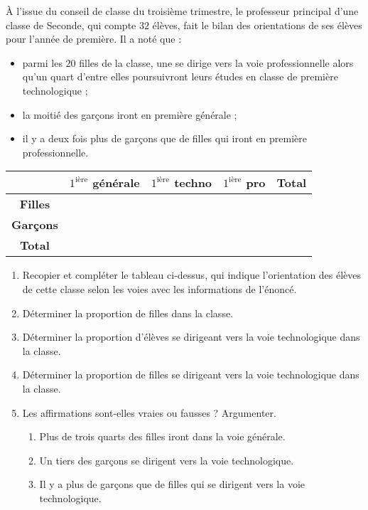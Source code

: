 \documentclass[11pt]{article}
\begin{document}
\begin{exo}
À l’issue du conseil de classe du troisième trimestre, le professeur principal
d’une classe de Seconde, qui compte $32$ élèves, fait le bilan des orientations de ses élèves pour l’année de première. Il a noté que :
\begin{itemize}
  \item parmi les $20$ filles de la classe, une se dirige vers la voie
    professionnelle alors qu’un quart d’entre elles poursuivront leurs études en
    classe de première technologique ;
  \item la moitié des garçons iront en première générale ;
  \item il y a deux fois plus de garçons que de filles qui iront en première
    professionnelle.
\end{itemize}
  \begin{center}
    \def\arraystretch{1.75}
 \begin{tabular}{|c|c|c|c|c|}
   \hline
   & \textbf{$1^\text{ière}$ générale} & \textbf{$1^\text{ière}$ techno} &
   \textbf{$1^\text{ière}$ pro} &\textbf{Total} \\
   \hline
  \textbf{Filles} &  &  &  & \\
   \hline
   \textbf{Garçons} &  &  & &  \\
   \hline
  \textbf{Total} &  & & & \\
   \hline
\end{tabular}
\end{center}
\begin{enumerate}
  \item Recopier et compléter le tableau ci-dessus, qui indique l’orientation des
    élèves de cette classe selon les voies avec les informations de l’énoncé.
  \item Déterminer la proportion de filles dans la classe.
  \item Déterminer la proportion d’élèves se dirigeant vers la voie
    technologique dans la classe.
  \item Déterminer la proportion de filles se dirigeant vers la voie
    technologique dans la classe.
  \item Les affirmations sont-elles vraies ou fausses ? Argumenter.
    \begin{enumerate}
      \item Plus de trois quarts des filles iront dans la voie générale.
      \item Un tiers des garçons se dirigent vers la voie technologique.
      \item Il y a plus de garçons que de filles qui se dirigent vers la voie
        technologique.
    \end{enumerate}
\end{enumerate}
\end{exo}
\end{document}
